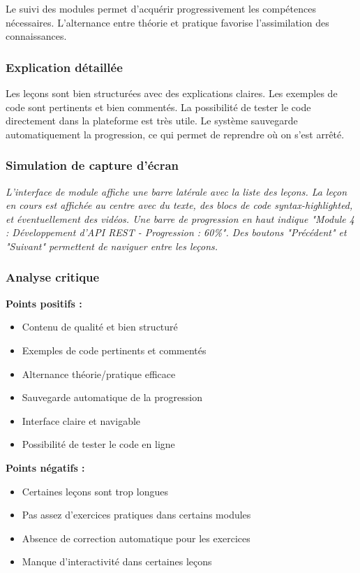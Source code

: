 \documentclass[12pt,a4paper]{article}
\begin{document}
Le suivi des modules permet d'acquérir progressivement les compétences nécessaires. L'alternance entre théorie et pratique favorise l'assimilation des connaissances.

\subsubsection{Explication détaillée}

Les leçons sont bien structurées avec des explications claires. Les exemples de code sont pertinents et bien commentés. La possibilité de tester le code directement dans la plateforme est très utile. Le système sauvegarde automatiquement la progression, ce qui permet de reprendre où on s'est arrêté.

\subsubsection{Simulation de capture d'écran}

\textit{L'interface de module affiche une barre latérale avec la liste des leçons. La leçon en cours est affichée au centre avec du texte, des blocs de code syntax-highlighted, et éventuellement des vidéos. Une barre de progression en haut indique "Module 4 : Développement d'API REST - Progression : 60\%". Des boutons "Précédent" et "Suivant" permettent de naviguer entre les leçons.}

\subsubsection{Analyse critique}

\textbf{Points positifs :}
\begin{itemize}
    \item Contenu de qualité et bien structuré
    \item Exemples de code pertinents et commentés
    \item Alternance théorie/pratique efficace
    \item Sauvegarde automatique de la progression
    \item Interface claire et navigable
    \item Possibilité de tester le code en ligne
\end{itemize}

\textbf{Points négatifs :}
\begin{itemize}
    \item Certaines leçons sont trop longues
    \item Pas assez d'exercices pratiques dans certains modules
    \item Absence de correction automatique pour les exercices
    \item Manque d'interactivité dans certaines leçons
\end{itemize}
\end{document}

